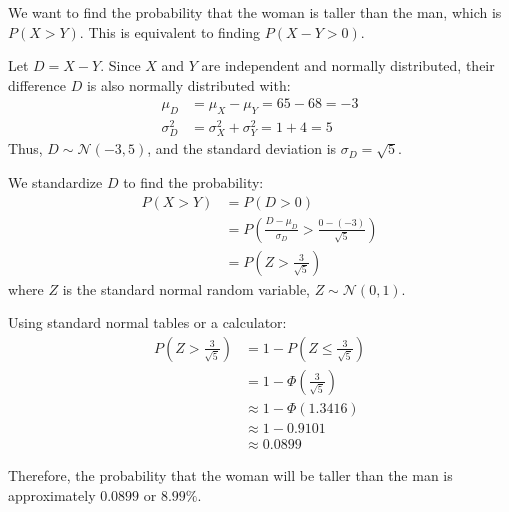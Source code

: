 \documentclass[12pt,a4paper]{ctexart}
\begin{document}
We want to find the probability that the woman is taller than the man, which is $P(X > Y)$. This is equivalent to finding $P(X - Y > 0)$.

Let $D = X - Y$. Since $X$ and $Y$ are independent and normally distributed, their difference $D$ is also normally distributed with:
\begin{align*}
    \mu_D &= \mu_X - \mu_Y = 65 - 68 = -3 \\
    \sigma_D^2 &= \sigma_X^2 + \sigma_Y^2 = 1 + 4 = 5
\end{align*}
Thus, $D \sim \mathcal{N}(-3, 5)$, and the standard deviation is $\sigma_D = \sqrt{5}$.

We standardize $D$ to find the probability:
\begin{align*}
    P(X > Y) &= P(D > 0) \\
    &= P\left( \frac{D - \mu_D}{\sigma_D} > \frac{0 - (-3)}{\sqrt{5}} \right) \\
    &= P\left( Z > \frac{3}{\sqrt{5}} \right)
\end{align*}
where $Z$ is the standard normal random variable, $Z \sim \mathcal{N}(0, 1)$.

Using standard normal tables or a calculator:
\begin{align*}
    P\left( Z > \frac{3}{\sqrt{5}} \right) &= 1 - P\left( Z \le \frac{3}{\sqrt{5}} \right) \\
    &= 1 - \Phi\left( \frac{3}{\sqrt{5}} \right) \\
    &\approx 1 - \Phi(1.3416) \\
    &\approx 1 - 0.9101 \\
    &\approx 0.0899
\end{align*}

Therefore, the probability that the woman will be taller than the man is approximately $0.0899$ or $8.99\%$.
\end{document}

